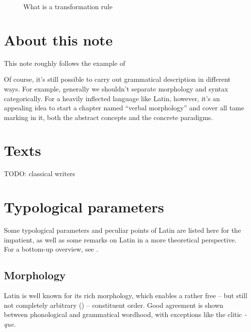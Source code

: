 \documentclass[a4paper, oneside]{report}
\newcommand{\form}[1]{\emph{#1}}
\begin{document}
\begin{figure}[H]
    \caption{What is a transformation rule}
    \label{fig:transformation-rule}        
\end{figure}

\section{About this note}

This note roughly follows the example of 

Of course, it's still possible to carry out grammatical description in different ways.  
For example, generally we shouldn't separate morphology and syntax categorically.
For a heavily inflected language like Latin, however, 
it's an appealing idea 
to start a chapter named ``verbal morphology''
and cover all \acs{tame} marking in it, 
both the abstract concepts and the concrete paradigms. 

\section{Texts}

TODO: classical writers

\section{Typological parameters}

Some typological parameters and peculiar points of Latin 
are listed here for the impatient,
as well as some remarks on Latin in a more theoretical perspective.
For a bottom-up overview, 
see .

\subsection{Morphology}

Latin is well known for its rich morphology,
which enables a rather free -- but still not completely arbitrary ()
-- constituent order.
Good agreement is shown between phonological and grammatical wordhood,
with exceptions like the clitic \form{-que}.
\end{document}
